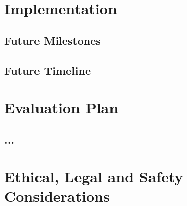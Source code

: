 \documentclass[12pt,oneside]{report}
\begin{document}
\chapter{Implementation}

\section{Future Milestones} \label{FuturePlanning}
\pagebreak
\section{Future Timeline}

\pagebreak

\chapter{Evaluation Plan}
\section{...}

\chapter{Ethical, Legal and Safety Considerations}



\newpage
\nocite{*}

\end{document}
